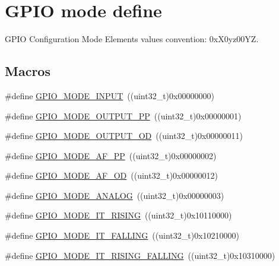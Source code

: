 \hypertarget{group___g_p_i_o__mode__define}{}\section{G\+P\+IO mode define}
\label{group___g_p_i_o__mode__define}


G\+P\+IO Configuration Mode Elements values convention\+: 0x\+X0yz00\+YZ.  


\subsection*{Macros}
\begin{DoxyCompactItemize}
\item 
\#define \hyperlink{group___g_p_i_o__mode__define_gaf40bec3146810028a84b628d37d3b391}{G\+P\+I\+O\+\_\+\+M\+O\+D\+E\+\_\+\+I\+N\+P\+UT}~((uint32\+\_\+t)0x00000000)
\item 
\#define \hyperlink{group___g_p_i_o__mode__define_ga1013838a64cec2f8c88f079c449d1982}{G\+P\+I\+O\+\_\+\+M\+O\+D\+E\+\_\+\+O\+U\+T\+P\+U\+T\+\_\+\+PP}~((uint32\+\_\+t)0x00000001)
\item 
\#define \hyperlink{group___g_p_i_o__mode__define_ga2f91757829f6e9505ec386b840941929}{G\+P\+I\+O\+\_\+\+M\+O\+D\+E\+\_\+\+O\+U\+T\+P\+U\+T\+\_\+\+OD}~((uint32\+\_\+t)0x00000011)
\item 
\#define \hyperlink{group___g_p_i_o__mode__define_ga526c72c5264316fc05c775b6cad4aa6a}{G\+P\+I\+O\+\_\+\+M\+O\+D\+E\+\_\+\+A\+F\+\_\+\+PP}~((uint32\+\_\+t)0x00000002)
\item 
\#define \hyperlink{group___g_p_i_o__mode__define_ga282b9fd37c8ef31daba314ffae6bf023}{G\+P\+I\+O\+\_\+\+M\+O\+D\+E\+\_\+\+A\+F\+\_\+\+OD}~((uint32\+\_\+t)0x00000012)
\item 
\#define \hyperlink{group___g_p_i_o__mode__define_ga7a04f9ab65ad572ad20791a35009220c}{G\+P\+I\+O\+\_\+\+M\+O\+D\+E\+\_\+\+A\+N\+A\+L\+OG}~((uint32\+\_\+t)0x00000003)
\item 
\#define \hyperlink{group___g_p_i_o__mode__define_ga088659562e68426d9a72821ea4fd8d50}{G\+P\+I\+O\+\_\+\+M\+O\+D\+E\+\_\+\+I\+T\+\_\+\+R\+I\+S\+I\+NG}~((uint32\+\_\+t)0x10110000)
\item 
\#define \hyperlink{group___g_p_i_o__mode__define_gaa166210a6da3ac7e8d7504702520e522}{G\+P\+I\+O\+\_\+\+M\+O\+D\+E\+\_\+\+I\+T\+\_\+\+F\+A\+L\+L\+I\+NG}~((uint32\+\_\+t)0x10210000)
\item 
\#define \hyperlink{group___g_p_i_o__mode__define_ga0678e61090ed61e91a6496f22ddfb3d1}{G\+P\+I\+O\+\_\+\+M\+O\+D\+E\+\_\+\+I\+T\+\_\+\+R\+I\+S\+I\+N\+G\+\_\+\+F\+A\+L\+L\+I\+NG}~((uint32\+\_\+t)0x10310000)

\end{DoxyCompactItemize}
